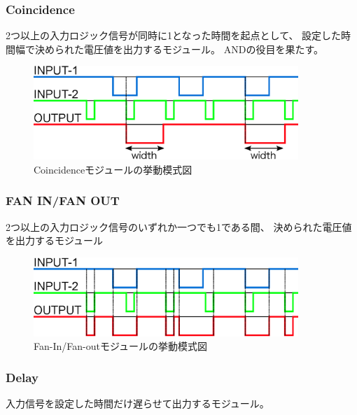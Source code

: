 \documentclass{jarticle}
\begin{document}
    	  \subsubsection*{Coincidence}
	  
	  2つ以上の入力ロジック信号が同時に1となった時間を起点として、
	  設定した時間幅で決められた電圧値を出力するモジュール。
	  ANDの役目を果たす。
	  
	  \begin{figure}[htbp]
	   \begin{center}
	    \includegraphics[width = 100mm]{./picture/Coincidence.eps}
	   \end{center}
	   \caption{Coincidenceモジュールの挙動模式図}
	   \label{Fig:Coincidence}
	  \end{figure}
	  
   \subsubsection*{FAN IN/FAN OUT}
	  
	  2つ以上の入力ロジック信号のいずれか一つでも1である間、
	  決められた電圧値を出力するモジュール
	  
	  \begin{figure}[H]
	   \begin{center}
	    \includegraphics[width = 100mm]{./picture/FaninFanout.eps}
	   \end{center}
	   \caption{Fan-In/Fan-outモジュールの挙動模式図}
	   \label{Fig:FaninFanout}
	  \end{figure}
	  
   \subsubsection*{Delay}
    	  
    	  入力信号を設定した時間だけ遅らせて出力するモジュール。
    	  
\end{document}

